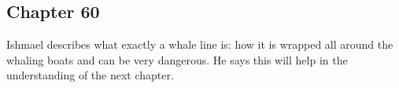 \subsection{Chapter 60}

Ishmael describes what exactly a whale line is: how it is wrapped all around
the whaling boats and can be very dangerous. He says this will help in the
understanding of the next chapter.
